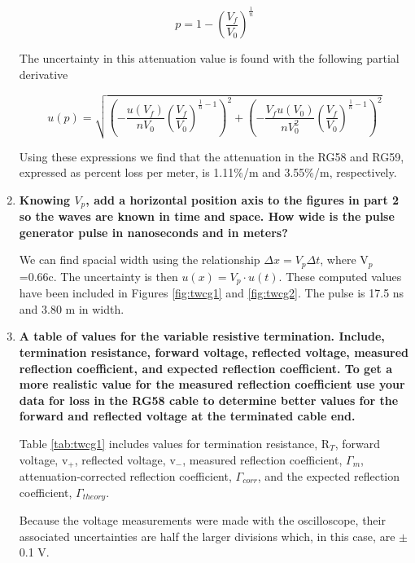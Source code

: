 \begin{enumerate}
\begin{equation}
p=1-\left(\dfrac{V_f}{V_0}\right)^{\frac{1}{n}}
\label{}
\end{equation}

The uncertainty in this attenuation value is found with the following partial derivative


\begin{equation}
u(p)=\sqrt{\left(-\dfrac{u(V_f)}{nV_0} \left(\dfrac{V_f}{V_0}\right)^{\frac{1}{n}-1}\right)^2+\left(-\dfrac{V_fu(V_0)}{nV_0^2} \left(\dfrac{V_f}{V_0}\right)^{\frac{1}{n}-1}\right)^2}
\label{}
\end{equation}



Using these expressions we find that the attenuation in the RG58 and RG59, expressed as percent loss per meter, is 1.11\%/m and 3.55\%/m, respectively.

\item {\bf Knowing $V_p$, add a horizontal position axis to the figures in part 2 so the waves are known in time and space. How wide is the pulse generator pulse in nanoseconds and in meters?}\newline

We can find spacial width using the relationship $\Delta x=V_p\Delta t$, where V$_p$=0.66c. The uncertainty is then $u(x)=V_p\cdot u(t)$. These computed values have been included in Figures \ref{fig:twcg1} and \ref{fig:twcg2}. The pulse is 17.5 ns and 3.80 m in width.

\item {\bf A table of values for the variable resistive termination. Include, termination resistance, forward voltage, reflected voltage, measured reflection coefficient, and expected reflection coefficient. To get a more realistic value for the measured reflection coefficient use your data for loss in the RG58 cable to determine better values for the forward and reflected voltage at the terminated cable end.}\newline

Table \ref{tab:twcg1} includes values for termination resistance, R$_T$, forward voltage, v$_+$, reflected voltage, v$_-$, measured reflection coefficient, $\Gamma_m$, attenuation-corrected reflection coefficient, $\Gamma_{corr}$, and the expected reflection coefficient, $\Gamma_{theory}$.

Because the voltage measurements were made with the oscilloscope, their associated uncertainties are half the larger divisions which, in this case, are $\pm$0.1 V.


\end{enumerate}
